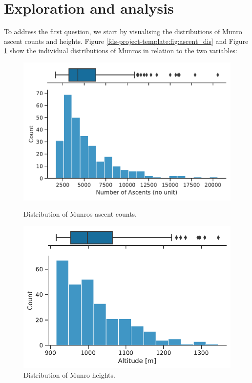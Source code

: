 \documentclass[11pt,a4paper]{article}
\begin{document}

\section{Exploration and  analysis}

To address the first question, we start by visualising the distributions of Munro ascent counts and heights. Figure \ref{fds-project-template:fig:ascent_dis} and Figure \ref{fds-project-template:fig:altitude_dis} show the individual distributions of Munros in relation to the two variables:
\begin{figure}[h!]
   \begin{minipage}{0.48\textwidth}
     \centering
     \includegraphics[width=1.2\linewidth]{report/ascent_distribution.pdf}
     \caption{Distribution of Munros ascent counts.}
     \label{fds-project-template:fig:ascent_dis}
   \end{minipage}\hfill
   \begin{minipage}{0.48\textwidth}
     \centering
     \includegraphics[width=1.2\linewidth]{report/altitude_distribution.pdf}
     \caption{Distribution of Munro heights.}
     \label{fds-project-template:fig:altitude_dis}
   \end{minipage}
\end{figure} \\
\end{document}
